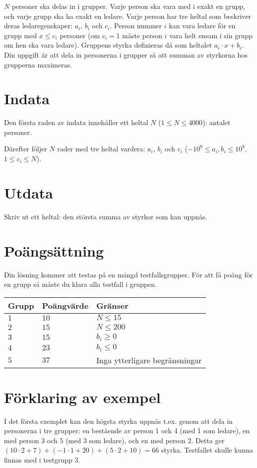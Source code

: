 
$N$ personer ska delas in i grupper.
Varje person ska vara med i exakt en grupp, och varje grupp ska ha exakt en ledare.
Varje person har tre heltal som beskriver deras ledaregenskaper: $a_i$, $b_i$ och $c_i$.
Person nummer $i$ kan vara ledare för en grupp med $x \le c_i$ personer
(om $c_i=1$ måste person $i$ vara helt ensam i sin grupp om hen ska vara ledare).
Gruppens styrka definieras då som heltalet $a_i\cdot x + b_i$.
Din uppgift är att dela in personerna i grupper så att summan av styrkorna hos grupperna maximeras.

\section*{Indata}
Den första raden av indata innehåller ett heltal $N$ ($1 \le N \le 4000$): antalet personer.

Därefter följer $N$ rader med tre heltal vardera: $a_i$, $b_i$ och $c_i$ ($-10^9 \le a_i, b_i \le 10^9$, $1 \le c_i \le N$).

\section*{Utdata}

Skriv ut ett heltal: den största summa av styrkor som kan uppnås.

\section*{Poängsättning}
Din lösning kommer att testas på en mängd testfallsgrupper.
För att få poäng för en grupp så måste du klara alla testfall i gruppen.

\noindent
\begin{tabular}{| l | l | l |}
  \hline
  Grupp & Poängvärde & Gränser \\ \hline
  $1$   & $10$       &  $N \le 15$ \\ \hline
  $2$   & $15$       &  $N \le 200$ \\ \hline
  $3$   & $15$       &  $b_i \ge 0$ \\ \hline
  $4$   & $23$       &  $b_i \le 0$ \\ \hline
  $5$   & $37$       &  Inga ytterligare begränsningar \\ \hline
\end{tabular}

\section*{Förklaring av exempel}
I det första exemplet kan den högsta styrka uppnås t.ex. genom att dela in personerna i tre grupper:
en bestående av person 1 och 4 (med 1 som ledare), en med person 3 och 5 (med 3 som ledare), och en med person 2.
Detta ger $(10 \cdot 2 + 7) + (-1 \cdot 1 + 20) + (5 \cdot 2 + 10) = 66$ styrka.
Testfallet skulle kunna finnas med i testgrupp 3.

